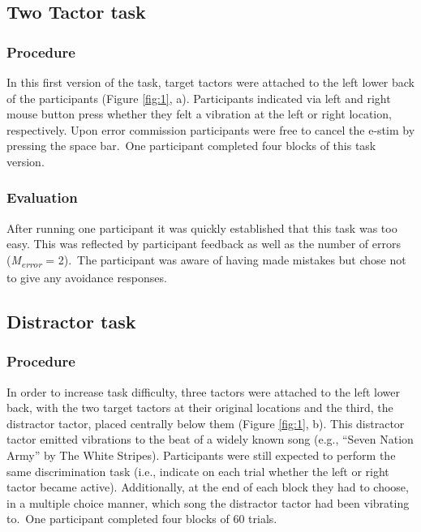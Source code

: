 \documentclass[twocolumn, serif, authordate, empirical]{jote-article}
\begin{document}
 {}\subsection*{Two Tactor task} 
 {}
\subsubsection*{Procedure}
In this first version of the task, target tactors were attached to the left lower back of the participants (Figure \ref{fig:1}, a). Participants indicated via left and right mouse button press whether they felt a vibration at the left or right location, respectively. Upon error commission participants were free to cancel the e-stim by pressing the space bar.~One participant completed four blocks of this task version.

 {}
\subsubsection*{Evaluation} After running one participant it was quickly established that this task was too easy. This was reflected by participant feedback as well as the number of errors (\emph{M}\textsubscript{\emph{error}} = 2).~The participant was aware of having made mistakes but chose not to give any avoidance responses.


 {}\subsection*{Distractor task} 

 {}
\subsubsection*{Procedure} In order to increase task difficulty, three tactors were attached to the left lower back, with the two target tactors at their original locations and the third, the distractor tactor, placed centrally below them (Figure \ref{fig:1}, b). This distractor tactor emitted vibrations to the beat of a widely known song (e.g., ``Seven Nation Army'' by The White Stripes). Participants were still expected to perform the same discrimination task (i.e., indicate on each trial whether the left or right tactor became active). Additionally, at the end of each block they had to choose, in a multiple choice manner, which song the distractor tactor had been vibrating to.~One participant completed four blocks of 60 trials.~
\end{document}
